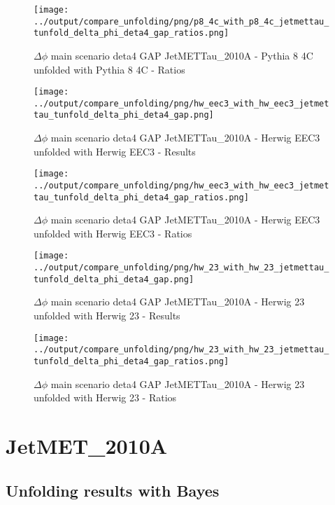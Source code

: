 \documentclass[11pt]{book}
\begin{document}
\begin{figure}[ht]
\centering
\texttt{[image: ../output/compare\_unfolding/png/p8\_4c\_with\_p8\_4c\_jetmettau\_tunfold\_delta\_phi\_deta4\_gap\_ratios.png]}
\caption{$\Delta\phi$ main scenario deta4 GAP JetMETTau\_2010A - Pythia 8 4C unfolded with Pythia 8 4C - Ratios}
\label{p8_p8_jetmettau_tunfold_delta_phi_deta4_gap_b}
\end{figure}

\begin{figure}[ht]
\centering
\texttt{[image: ../output/compare\_unfolding/png/hw\_eec3\_with\_hw\_eec3\_jetmettau\_tunfold\_delta\_phi\_deta4\_gap.png]}
\caption{$\Delta\phi$ main scenario deta4 GAP JetMETTau\_2010A - Herwig EEC3 unfolded with Herwig EEC3 - Results}
\label{hw_eec3_hw_eec3_jetmettau_tunfold_delta_phi_deta4_gap_a}
\end{figure}

\begin{figure}[ht]
\centering
\texttt{[image: ../output/compare\_unfolding/png/hw\_eec3\_with\_hw\_eec3\_jetmettau\_tunfold\_delta\_phi\_deta4\_gap\_ratios.png]}
\caption{$\Delta\phi$ main scenario deta4 GAP JetMETTau\_2010A - Herwig EEC3 unfolded with Herwig EEC3 - Ratios}
\label{hw_eec3_hw_eec3_jetmettau_tunfold_delta_phi_deta4_gap_b}
\end{figure}

\begin{figure}[ht]
\centering
\texttt{[image: ../output/compare\_unfolding/png/hw\_23\_with\_hw\_23\_jetmettau\_tunfold\_delta\_phi\_deta4\_gap.png]}
\caption{$\Delta\phi$ main scenario deta4 GAP JetMETTau\_2010A - Herwig 23 unfolded with Herwig 23 - Results}
\label{hw_23_hw_23_jetmettau_tunfold_delta_phi_deta4_gap_a}
\end{figure}

\begin{figure}[ht]
\centering
\texttt{[image: ../output/compare\_unfolding/png/hw\_23\_with\_hw\_23\_jetmettau\_tunfold\_delta\_phi\_deta4\_gap\_ratios.png]}
\caption{$\Delta\phi$ main scenario deta4 GAP JetMETTau\_2010A - Herwig 23 unfolded with Herwig 23 - Ratios}
\label{hw_23_hw_23_jetmettau_tunfold_delta_phi_deta4_gap_b}
\end{figure}


\clearpage
\section{JetMET\_2010A}
\subsection{Unfolding results with Bayes}
\end{document}
